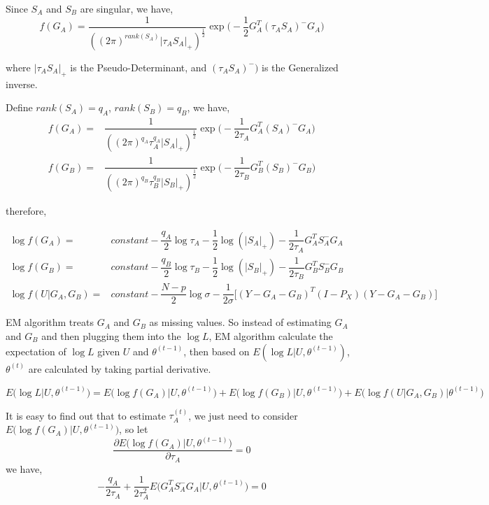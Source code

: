 \documentclass{article}
\begin{document}
            Since $S_A$ and $S_B$ are singular, we have,
            \[
                f(G_A)=\dfrac{1}{((2\pi)^{rank(S_A)}|\tau_AS_A|_+)^{\frac{1}{2}}}\exp\Big (-\dfrac{1}{2}G_A^T(\tau_AS_A)^-G_A\Big)
            \]

            where $|\tau_AS_A|_+$ is the Pseudo-Determinant, and $(\tau_AS_A)^-)$ is the Generalized inverse.

            Define $rank(S_A)=q_A$, $rank(S_B)=q_B$, we have,
            \[\begin{split}
                f(G_A)=&\dfrac{1}{((2\pi)^{q_A}\tau_A^{q_A}|S_A|_+)^{\frac{1}{2}}}\exp\Big (-\dfrac{1}{2\tau_A}G_A^T(S_A)^-G_A\Big)\\
                f(G_B)=&\dfrac{1}{((2\pi)^{q_B}\tau_B^{q_B}|S_B|_+)^{\frac{1}{2}}}\exp \Big(-\dfrac{1}{2\tau_B}G_B^T(S_B)^-G_B\Big)
            \end{split}\]

            therefore,

            \[\begin{split}
               \log f(G_A)=&constant -\dfrac{q_A}{2}\log \tau_A-\dfrac{1}{2}\log(|S_A|_+)-\dfrac{1}{2\tau_A}G_A^TS_A^-G_A\\
               \log f(G_B)=&constant -\dfrac{q_B}{2}\log \tau_B-\dfrac{1}{2}\log(|S_B|_+)-\dfrac{1}{2\tau_B}G_B^TS_B^-G_B\\
               \log f(U|G_A,G_B) =& constant-\dfrac{N-p}{2}\log\sigma-\dfrac{1}{2\sigma}\Big[(Y-G_A-G_B)^T(I-P_X)(Y-G_A-G_B)   \Big]
            \end{split}\]

            EM algorithm treats $G_A$ and $G_B$ as missing values. So instead of estimating $G_A$ and $G_B$ and then plugging them into the $\log L$, EM algorithm calculate the expectation of $\log L$ given $U$ and $\theta^{(t-1)}$, then based on $E(\log L|U,\theta^{(t-1)})$, $\theta^{(t)}$ are calculated by taking partial derivative.

            \[
                E\Big(\log L\Big|U,\theta^{(t-1)}\Big)=E\Big(\log f(G_A)\Big|U,\theta^{(t-1)}\Big)+E\Big(\log f(G_B)\Big|U,\theta^{(t-1)}\Big)+E\Big(\log f(U|G_A,G_B)\Big|\theta^{(t-1)}\Big)
            \]

            It is easy to find out that to estimate $\tau_A^{(t)}$, we just need to consider $E\Big(\log f(G_A)\Big|U,\theta^{(t-1)}\Big)$, so let
            \[\frac{\partial E\Big(\log f(G_A)\Big|U,\theta^{(t-1)}\Big)}{\partial\tau_A}=0\]
            we have,
            \[
                -\dfrac{q_A}{2\tau_A}+\dfrac{1}{2\tau_A^2}E\Big(G_A^TS_A^-G_A\Big|U,\theta^{(t-1)}  \Big)=0
            \]
\end{document}
